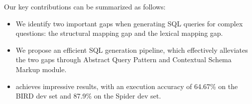 Our key contributions can be summarized as follows:
\begin{itemize}[leftmargin=*,itemsep=0pt,parsep=0.5em,topsep=0.3em,partopsep=0.3em] 
\item We identify two important gaps when generating SQL queries for complex questions: the structural mapping gap and the lexical mapping gap.
\item We propose an efficient SQL generation pipeline, which effectively alleviates the two gaps through Abstract Query Pattern and Contextual Schema Markup module.
\item \model achieves impressive results, with an execution accuracy of 64.67\% on the BIRD dev set and 87.9\% on the Spider dev set.
\end{itemize}